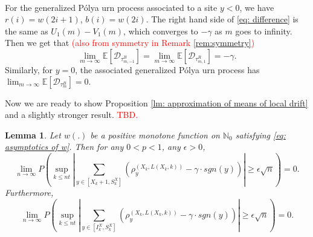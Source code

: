 \documentclass[twoside,12pt,a4paper]{article}
\newtheorem{lemma}{Lemma}[section]
\numberwithin{equation}{section}
\newcommand{\abs}[1]{\left\vert #1 \right\vert}
\newcommand\TBD{\textcolor{red}{TBD.}}
\newcommand{\edt}[1]{\textcolor{red}{#1}} %
\begin{document}
	\\
		For the generalized P\'{o}lya urn process associated to a site $y<0$, we have $r(i) = w(2i+1)$, $b(i) =w(2i)$. The right hand side of \eqref{eq: difference} is the same as $U_1(m)-V_1(m)$, which converges to $-\gamma$ as $m$ goes to infinity. Then we get that  \edt{(also from symmetry in Remark \ref{rem:symmetry})}
		\begin{equation}\label{eq: general expected drift}
		\lim_{m\to\infty}\mathbb{E}\left[ \mathcal{D}_{\tau^B_{m,-1}} \right] = \lim_{m\to\infty}\mathbb{E}\left[ \mathcal{D}_{\tau^R_{m,1}} \right] = -\gamma.
		\end{equation}
		Similarly, for $y=0$, the associated generalized P\'{o}lya urn process has 
		$\lim_{m\to\infty}\mathbb{E}\left[ \mathcal{D}_{\tau^B_m} \right] = 0.$
		
%		
		Now we are ready to show Proposition \ref{lm: approximation of means of local drift}
		 and a slightly stronger result. \TBD
		\begin{lemma}
			Let $w(.)$ be a positive monotone function on $\mathbb{N}_0$ satisfying \eqref{eq: asymptotics of w}. Then for any $0<p<1$, any $\epsilon>0$,
			$$
			\lim_{n\to\infty} P\left( \sup_{k\leq n t}  \abs{  	\sum_{y\in \left[X_{k}+1 ,S_{k}^X\right]} \left( \rho^{(X_k,L(X_k,k))}_y -  \gamma \cdot sgn(y) \right) } \geq  \epsilon \sqrt{n}     \right) =0.
			$$
			Furthermore,
		\[
	\lim_{n\to\infty} P\left( \sup_{k\leq n t}  \abs{  	\sum_{y\in \left[I_k^{X} ,S_{k}^X\right]} \left( \rho^{(X_k,L(X_k,k))}_y -  \gamma \cdot sgn(y) \right) } \geq  \epsilon \sqrt{n}     \right) =0.
	\]
\end{lemma}
\end{document}
